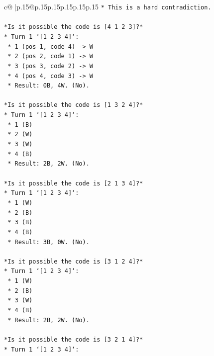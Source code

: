 \documentclass{article}
\begin{document}
{\begin{supertabular}{c@{$\;$}|p{.15\linewidth}@{}p{.15\linewidth}p{.15\linewidth}p{.15\linewidth}p{.15\linewidth}p{.15\linewidth}}
{{{\texttt{*   This is a hard contradiction.} \\
\\ 
\texttt{*Is it possible the code is {[}4 1 2 3{]}?*} \\
\texttt{*   Turn 1 `{[}1 2 3 4{]}`:} \\
\texttt{    *   1 (pos 1, code 4) {-}> W} \\
\texttt{    *   2 (pos 2, code 1) {-}> W} \\
\texttt{    *   3 (pos 3, code 2) {-}> W} \\
\texttt{    *   4 (pos 4, code 3) {-}> W} \\
\texttt{    *   Result: 0B, 4W. (No).} \\
\\ 
\texttt{*Is it possible the code is {[}1 3 2 4{]}?*} \\
\texttt{*   Turn 1 `{[}1 2 3 4{]}`:} \\
\texttt{    *   1 (B)} \\
\texttt{    *   2 (W)} \\
\texttt{    *   3 (W)} \\
\texttt{    *   4 (B)} \\
\texttt{    *   Result: 2B, 2W. (No).} \\
\\ 
\texttt{*Is it possible the code is {[}2 1 3 4{]}?*} \\
\texttt{*   Turn 1 `{[}1 2 3 4{]}`:} \\
\texttt{    *   1 (W)} \\
\texttt{    *   2 (B)} \\
\texttt{    *   3 (B)} \\
\texttt{    *   4 (B)} \\
\texttt{    *   Result: 3B, 0W. (No).} \\
\\ 
\texttt{*Is it possible the code is {[}3 1 2 4{]}?*} \\
\texttt{*   Turn 1 `{[}1 2 3 4{]}`:} \\
\texttt{    *   1 (W)} \\
\texttt{    *   2 (B)} \\
\texttt{    *   3 (W)} \\
\texttt{    *   4 (B)} \\
\texttt{    *   Result: 2B, 2W. (No).} \\
\\ 
\texttt{*Is it possible the code is {[}3 2 1 4{]}?*} \\
\texttt{*   Turn 1 `{[}1 2 3 4{]}`:} \\
}}}
\end{supertabular}}
\end{document}
